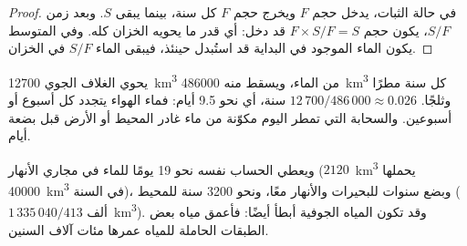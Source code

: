 \begin{proof}
في حالة الثبات، يدخل حجم $F$ ويخرج حجم $F$ كل سنة، بينما يبقى
 $S$. وبعد زمن $S/F$، يكون حجم $F \times S/F = S$ قد
دخل: أي قدر ما يحويه الخزان كله. وفي المتوسط يكون الماء الموجود في
البداية قد استُبدل حينئذ، فيبقى الماء $S/F$ في الخزان.
\end{proof}

\begin{example}\label{ex:g10:freshwater-resources:atmosphere}
يحوي الغلاف الجوي \num{12700}~\unit{km^3} من الماء، ويسقط منه
\num{486000}~\unit{km^3} كل سنة مطرًا وثلجًا.  $12\,700/486\,000 \approx \num{0.026}$ سنة، أي نحو
\num{9.5} أيام: فماء الهواء يتجدد كل أسبوع أو أسبوعين. والسحابة
التي تمطر اليوم مكوّنة من ماء غادر المحيط أو الأرض قبل بضعة
أيام.
\end{example}

ويعطي الحساب نفسه نحو \num{19} يومًا للماء في مجاري الأنهار
($2120$~\unit{km^3} يحملها \num{40000}~\unit{km^3} في السنة)، وبضع
سنوات للبحيرات والأنهار معًا، ونحو \num{3200} سنة للمحيط
($1\,335\,040/413$ ألف~\unit{km^3}). وقد تكون المياه الجوفية أبطأ أيضًا: فأعمق
مياه بعض الطبقات الحاملة للمياه عمرها مئات آلاف السنين.

